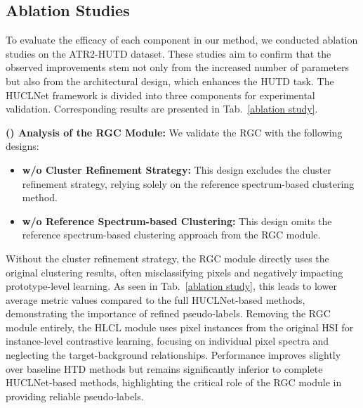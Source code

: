 \subsection{Ablation Studies}\label{sec:4.4}
To evaluate the efficacy of each component in our method, we conducted ablation studies on the ATR2-HUTD dataset. These studies aim to confirm that the observed improvements stem not only from the increased number of parameters but also from the architectural design, which enhances the HUTD task. The HUCLNet framework is divided into three components for experimental validation. 
Corresponding results are presented in Tab.~\ref{ablation study}.
\par
\textbf{() Analysis of the RGC Module:} We validate the RGC with the following designs: 
\begin{itemize}
    \item \textbf{w/o Cluster Refinement Strategy:} This design excludes the cluster refinement strategy, relying solely on the reference spectrum-based clustering method. 
    \item \textbf{w/o Reference Spectrum-based Clustering:} This design omits the reference spectrum-based clustering approach from the RGC module.
\end{itemize}
\par
Without the cluster refinement strategy, the RGC module directly uses the original clustering results, often misclassifying pixels and negatively impacting prototype-level learning. As seen in Tab.~\ref{ablation study}, this leads to lower average metric values compared to the full HUCLNet-based methods, demonstrating the importance of refined pseudo-labels. Removing the RGC module entirely, the HLCL module uses pixel instances from the original HSI for instance-level contrastive learning, focusing on individual pixel spectra and neglecting the target-background relationships. Performance improves slightly over baseline HTD methods but remains significantly inferior to complete HUCLNet-based methods, highlighting the critical role of the RGC module in providing reliable pseudo-labels.
